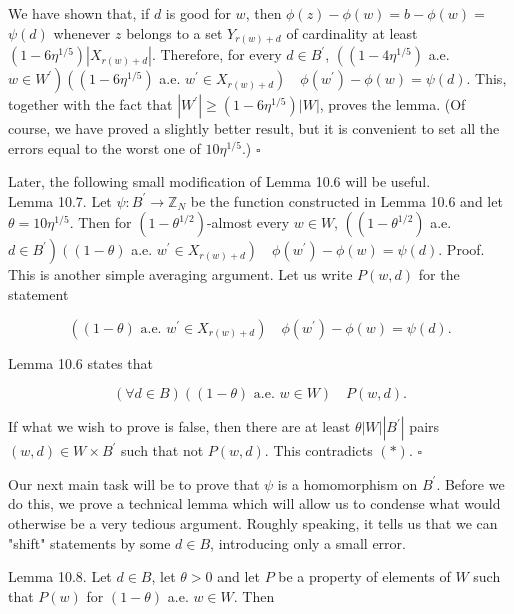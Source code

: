\documentclass[10pt]{article}
\begin{document}
We have shown that, if $d$ is good for $w$, then $\phi(z)-\phi(w)=b-\phi(w)=$ $\psi(d)$ whenever $z$ belongs to a set $Y_{r(w)+d}$ of cardinality at least\\
$\left(1-6 \eta^{1 / 5}\right)\left|X_{r(w)+d}\right|$. Therefore, for every $d \in B^{\prime}$, $\left(\left(1-4 \eta^{1 / 5}\right)\right.$ a.e. $\left.w \in W^{\prime}\right)\left(\left(1-6 \eta^{1 / 5}\right)\right.$ a.e. $\left.w^{\prime} \in X_{r(w)+d}\right) \quad \phi\left(w^{\prime}\right)-\phi(w)=\psi(d)$. This, together with the fact that $\left|W^{\prime}\right| \geqslant\left(1-6 \eta^{1 / 5}\right)|W|$, proves the lemma. (Of course, we have proved a slightly better result, but it is convenient to set all the errors equal to the worst one of $10 \eta^{1 / 5}$.) \(\square\)

Later, the following small modification of Lemma 10.6 will be useful.\\
Lemma 10.7. Let $\psi: B^{\prime} \rightarrow \mathbb{Z}_{N}$ be the function constructed in Lemma 10.6 and let $\theta=10 \eta^{1 / 5}$. Then for $\left(1-\theta^{1 / 2}\right)$-almost every $w \in W$, $\left(\left(1-\theta^{1 / 2}\right)\right.$ a.e. $\left.d \in B^{\prime}\right)\left((1-\theta)\right.$ a.e. $\left.w^{\prime} \in X_{r(w)+d}\right) \quad \phi\left(w^{\prime}\right)-\phi(w)=\psi(d)$. Proof. This is another simple averaging argument. Let us write $P(w, d)$ for the statement

$$
\left((1-\theta) \text { a.e. } w^{\prime} \in X_{r(w)+d}\right) \quad \phi\left(w^{\prime}\right)-\phi(w)=\psi(d) .
$$

Lemma 10.6 states that


\begin{equation*}
(\forall d \in B)((1-\theta) \text { a.e. } w \in W) \quad P(w, d) . \tag{*}
\end{equation*}


If what we wish to prove is false, then there are at least $\theta|W|\left|B^{\prime}\right|$ pairs $(w, d) \in W \times B^{\prime}$ such that not $P(w, d)$. This contradicts $(*)$. \(\square\)

Our next main task will be to prove that $\psi$ is a homomorphism on $B^{\prime}$. Before we do this, we prove a technical lemma which will allow us to condense what would otherwise be a very tedious argument. Roughly speaking, it tells us that we can "shift" statements by some $d \in B$, introducing only a small error.

Lemma 10.8. Let $d \in B$, let $\theta>0$ and let $P$ be a property of elements of $W$ such that $P(w)$ for $(1-\theta)$ a.e. $w \in W$. Then
\end{document}
